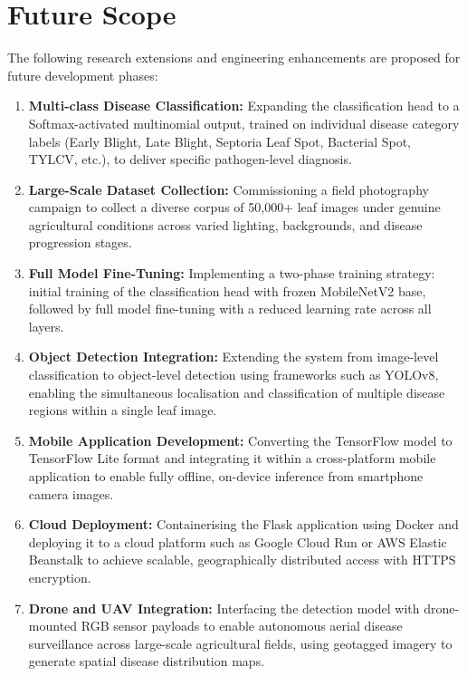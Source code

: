 \documentclass[12pt,a4paper]{report}
\begin{document}
\section{Future Scope}

The following research extensions and engineering enhancements are proposed for future development phases:

\begin{enumerate}[label=\arabic*., itemsep=6pt]
    \item \textbf{Multi-class Disease Classification:} Expanding the classification head to a Softmax-activated multinomial output, trained on individual disease category labels (Early Blight, Late Blight, Septoria Leaf Spot, Bacterial Spot, TYLCV, etc.), to deliver specific pathogen-level diagnosis.

    \item \textbf{Large-Scale Dataset Collection:} Commissioning a field photography campaign to collect a diverse corpus of 50,000+ leaf images under genuine agricultural conditions across varied lighting, backgrounds, and disease progression stages.

    \item \textbf{Full Model Fine-Tuning:} Implementing a two-phase training strategy: initial training of the classification head with frozen MobileNetV2 base, followed by full model fine-tuning with a reduced learning rate across all layers.

    \item \textbf{Object Detection Integration:} Extending the system from image-level classification to object-level detection using frameworks such as YOLOv8, enabling the simultaneous localisation and classification of multiple disease regions within a single leaf image.

    \item \textbf{Mobile Application Development:} Converting the TensorFlow model to TensorFlow Lite format and integrating it within a cross-platform mobile application to enable fully offline, on-device inference from smartphone camera images.

    \item \textbf{Cloud Deployment:} Containerising the Flask application using Docker and deploying it to a cloud platform such as Google Cloud Run or AWS Elastic Beanstalk to achieve scalable, geographically distributed access with HTTPS encryption.

    \item \textbf{Drone and UAV Integration:} Interfacing the detection model with drone-mounted RGB sensor payloads to enable autonomous aerial disease surveillance across large-scale agricultural fields, using geotagged imagery to generate spatial disease distribution maps.
\end{enumerate}
\end{document}
